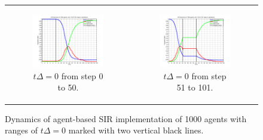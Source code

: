 \begin{figure}
\begin{center}
	\begin{tabular}{c c}
		\begin{subfigure}[b]{0.5\textwidth}
			\centering
			\includegraphics[width=.8\textwidth, angle=0]{./../shared/fig/SIR_ABS_zeroDt_start.png}
			\caption{$t\Delta = 0$ from step 0 to 50.}
			\label{fig:sd_plot_10dt}
		\end{subfigure}
	
		& 
		
		\begin{subfigure}[b]{0.5\textwidth}
			\centering
			\includegraphics[width=.8\textwidth, angle=0]{./../shared/fig/SIR_ABS_zeroDt_mid.png}
			\caption{$t\Delta = 0$ from step 51 to 101.}
			\label{fig:sd_plot_0.01dt}
		\end{subfigure}
	\end{tabular}
	
	\caption{Dynamics of agent-based SIR implementation of 1000 agents with ranges of $t\Delta = 0$ marked with two vertical black lines.}
	\label{fig:sir_abs_zero_dt}
\end{center}
\end{figure}

